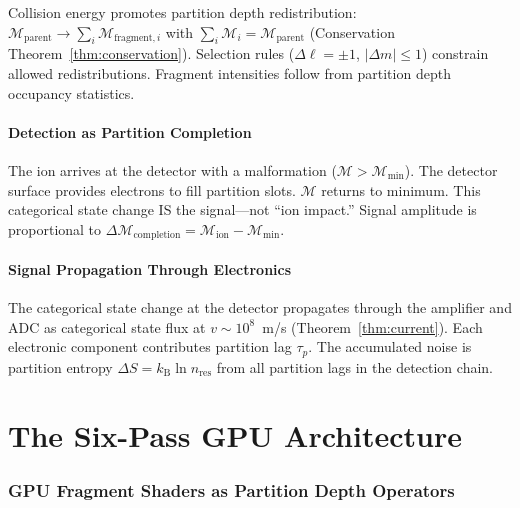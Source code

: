 \documentclass[11pt,twocolumn,a4paper]{article}
\theoremstyle{definition}
\theoremstyle{remark}
\newcommand{\kB}{k_{\mathrm{B}}}
\newcommand{\Depth}{\mathcal{M}}
\newcommand{\taup}{\tau_p}
\begin{document}
Collision energy promotes partition depth redistribution: $\Depth_{\mathrm{parent}} \to \sum_i \Depth_{\mathrm{fragment},i}$ with $\sum_i \Depth_i = \Depth_{\mathrm{parent}}$ (Conservation Theorem~\ref{thm:conservation}). Selection rules ($\Delta\ell = \pm 1$, $|\Delta m| \leq 1$) constrain allowed redistributions. Fragment intensities follow from partition depth occupancy statistics.

\subsection{Detection as Partition Completion}

The ion arrives at the detector with a malformation ($\Depth > \Depth_{\min}$). The detector surface provides electrons to fill partition slots. $\Depth$ returns to minimum. This categorical state change IS the signal---not ``ion impact.'' Signal amplitude is proportional to $\Delta\Depth_{\mathrm{completion}} = \Depth_{\mathrm{ion}} - \Depth_{\min}$.

\subsection{Signal Propagation Through Electronics}

The categorical state change at the detector propagates through the amplifier and ADC as categorical state flux at $v \sim 10^8$~m/s (Theorem~\ref{thm:current}). Each electronic component contributes partition lag $\taup$. The accumulated noise is partition entropy $\Delta S = \kB\ln n_{\mathrm{res}}$ from all partition lags in the detection chain.


\part{The Six-Pass GPU Architecture}

\section{GPU Fragment Shaders as Partition Depth Operators}
\label{sec:six_pass}
\end{document}
